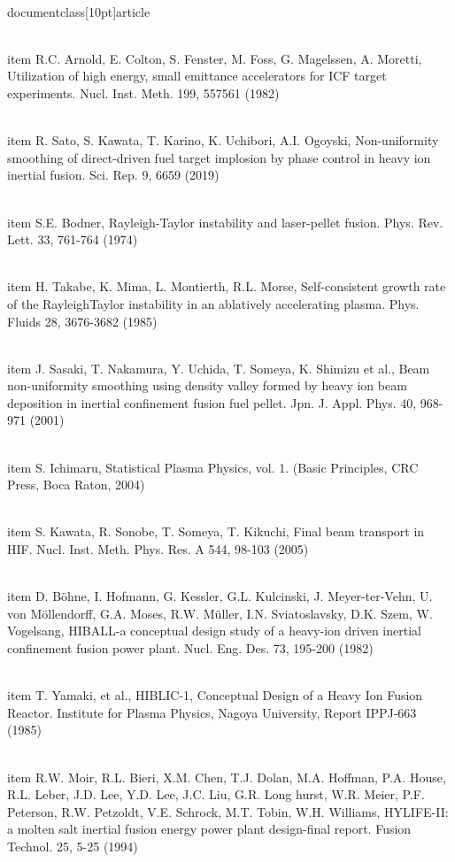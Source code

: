 \\documentclass[10pt]{article}
\begin{document}
{{{{{{  \\item R.C. Arnold, E. Colton, S. Fenster, M. Foss, G. Magelssen, A. Moretti, Utilization of high energy, small emittance accelerators for ICF target experiments. Nucl. Inst. Meth. 199, 557561 (1982)

  \\item R. Sato, S. Kawata, T. Karino, K. Uchibori, A.I. Ogoyski, Non-uniformity smoothing of direct-driven fuel target implosion by phase control in heavy ion inertial fusion. Sci. Rep. 9, 6659 (2019)

  \\item S.E. Bodner, Rayleigh-Taylor instability and laser-pellet fusion. Phys. Rev. Lett. 33, 761-764 (1974)

  \\item H. Takabe, K. Mima, L. Montierth, R.L. Morse, Self-consistent growth rate of the RayleighTaylor instability in an ablatively accelerating plasma. Phys. Fluids 28, 3676-3682 (1985)

  \\item J. Sasaki, T. Nakamura, Y. Uchida, T. Someya, K. Shimizu et al., Beam non-uniformity smoothing using density valley formed by heavy ion beam deposition in inertial confinement fusion fuel pellet. Jpn. J. Appl. Phys. 40, 968-971 (2001)

  \\item S. Ichimaru, Statistical Plasma Physics, vol. 1. (Basic Principles, CRC Press, Boca Raton, 2004)

  \\item S. Kawata, R. Sonobe, T. Someya, T. Kikuchi, Final beam transport in HIF. Nucl. Inst. Meth. Phys. Res. A 544, 98-103 (2005)

  \\item D. Böhne, I. Hofmann, G. Kessler, G.L. Kulcinski, J. Meyer-ter-Vehn, U. von Möllendorff, G.A. Moses, R.W. Müller, I.N. Sviatoslavsky, D.K. Szem, W. Vogelsang, HIBALL-a conceptual design study of a heavy-ion driven inertial confinement fusion power plant. Nucl. Eng. Des. 73, 195-200 (1982)

  \\item T. Yamaki, et al., HIBLIC-1, Conceptual Design of a Heavy Ion Fusion Reactor. Institute for Plasma Physics, Nagoya University, Report IPPJ-663 (1985)

  \\item R.W. Moir, R.L. Bieri, X.M. Chen, T.J. Dolan, M.A. Hoffman, P.A. House, R.L. Leber, J.D. Lee, Y.D. Lee, J.C. Liu, G.R. Long hurst, W.R. Meier, P.F. Peterson, R.W. Petzoldt, V.E. Schrock, M.T. Tobin, W.H. Williams, HYLIFE-II: a molten salt inertial fusion energy power plant design-final report. Fusion Technol. 25, 5-25 (1994)

}}}}}}
\end{document}
